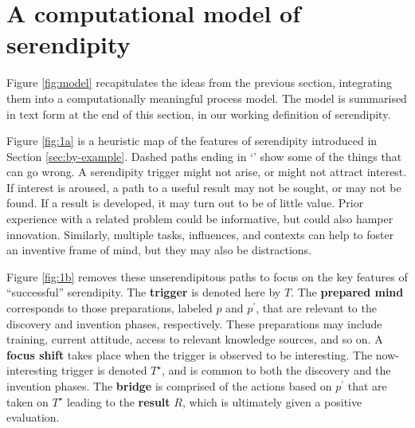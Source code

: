 \section{A computational model of serendipity} \label{sec:our-model}

Figure \ref{fig:model} recapitulates the ideas from the previous
section, integrating them into a computationally meaningful process 
model.  The model is summarised in text form at the end of this
section, in our working definition of serendipity.

Figure \ref{fig:1a} is a heuristic map of the features of serendipity
introduced in Section \ref{sec:by-example}.
%
Dashed paths ending in `\ymark' show some of the things that can go
wrong.  A serendipity trigger might not arise, or might not attract
interest.  If interest is aroused, a path to a useful result may not
be sought, or may not be found.  If a result is
developed, it may turn out to be of little value.  Prior experience
with a related problem could be informative, but could also hamper
innovation.  Similarly, multiple tasks, influences, and
contexts can help to foster an inventive frame of mind, but they may
also be distractions.

Figure \ref{fig:1b} removes these unserendipitous paths to focus on
the key features of ``successful'' serendipity.
%
The \textbf{trigger} is denoted here by $T$.  
%
The \textbf{prepared mind} corresponds to those preparations, labeled
$p$ and $p^{\prime}$, that are relevant to the discovery and invention
phases, respectively.  These preparations may include training,
current attitude, access to relevant knowledge sources, and so on.
%
A \textbf{focus shift} takes place when the trigger is observed to be
interesting.  The now-interesting trigger is denoted $T^\star$, and is
common to both the discovery and the invention phases.
%
%
The \textbf{bridge} is comprised of the actions based on $p^{\prime}$
that are taken on $T^\star$ leading to the \textbf{result} $R$, which is ultimately given a positive evaluation.

